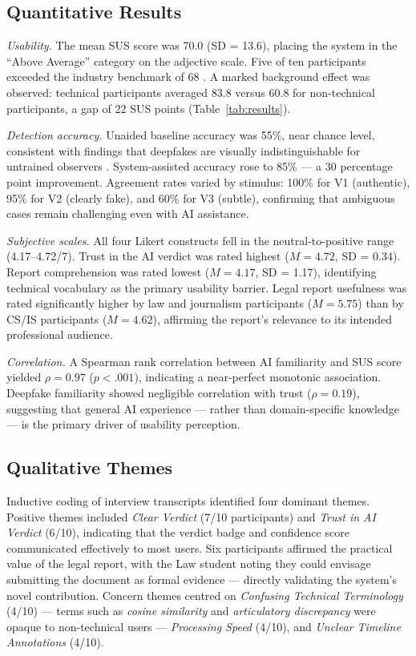 \documentclass[12pt]{article}
\begin{document}
\subsection{Quantitative Results}

\textit{Usability.}
The mean SUS score was 70.0 (SD = 13.6), placing the system in the
``Above Average'' category on the \citet{bangor2009} adjective scale.
Five of ten participants exceeded the industry benchmark of 68 \citep{brooke1996}.
A marked background effect was observed: technical participants averaged 83.8
versus 60.8 for non-technical participants, a gap of 22 SUS points
(Table~\ref{tab:results}).

\textit{Detection accuracy.}
Unaided baseline accuracy was 55\%, near chance level, consistent with findings
that deepfakes are visually indistinguishable for untrained observers
\citep{westerlund2019}.
System-assisted accuracy rose to 85\% --- a 30 percentage point improvement.
Agreement rates varied by stimulus: 100\% for V1 (authentic),
95\% for V2 (clearly fake), and 60\% for V3 (subtle), confirming that ambiguous
cases remain challenging even with AI assistance.

\textit{Subjective scales.}
All four Likert constructs fell in the neutral-to-positive range (4.17--4.72/7).
Trust in the AI verdict was rated highest ($M = 4.72$, SD = 0.34).
Report comprehension was rated lowest ($M = 4.17$, SD = 1.17), identifying
technical vocabulary as the primary usability barrier.
Legal report usefulness was rated significantly higher by law and journalism
participants ($M = 5.75$) than by CS/IS participants ($M = 4.62$), affirming the
report's relevance to its intended professional audience.

\textit{Correlation.}
A Spearman rank correlation between AI familiarity and SUS score yielded
$\rho = 0.97$ ($p < .001$), indicating a near-perfect monotonic association.
Deepfake familiarity showed negligible correlation with trust ($\rho = 0.19$),
suggesting that general AI experience --- rather than domain-specific knowledge
--- is the primary driver of usability perception.

\subsection{Qualitative Themes}

Inductive coding of interview transcripts identified four dominant themes.
Positive themes included \textit{Clear Verdict} (7/10 participants) and
\textit{Trust in AI Verdict} (6/10), indicating that the verdict badge and
confidence score communicated effectively to most users.
Six participants affirmed the practical value of the legal report, with the Law
student noting they could envisage submitting the document as formal evidence ---
directly validating the system's novel contribution.
Concern themes centred on \textit{Confusing Technical Terminology} (4/10)
--- terms such as \textit{cosine similarity} and
\textit{articulatory discrepancy} were opaque to non-technical users ---
\textit{Processing Speed} (4/10), and \textit{Unclear Timeline Annotations}
(4/10).
\end{document}
